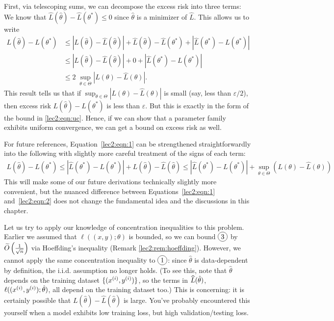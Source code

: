 First, via telescoping sums, we can decompose the excess risk into three terms:
We know that $\hat{L}(\hat{\theta}) - \hat{L}(\theta^*) \leq 0$ since $\hat{\theta}$ is a minimizer of $\hat{L}$. This allows us to write
\begin{align}
L(\hat{\theta}) - L(\theta^*) &\leq |L(\hat{\theta}) - \hat{L}(\hat{\theta})| + \hat{L}(\hat{\theta}) - \hat{L}(\theta^*) + |\hat{L}(\theta^*) - L(\theta^*)|\\
&\leq |L(\hat{\theta}) - \hat{L}(\hat{\theta})| + 0 + |\hat{L}(\theta^*) - L(\theta^*)|\\
&\leq 2\;\sup_{\theta \in \Theta } |L(\theta) - \hat{L}(\theta)|. \label{lec2:eqn:1}
\end{align}
This result tells us that if $\sup_{\theta \in \Theta } |L(\theta) - \hat{L}(\theta)|$ is small (say, less than $\varepsilon/2$), then excess risk $L(\hat{\theta}) - L(\theta^*)$ is less than $\varepsilon$. But this is exactly in the form of the bound in \eqref{lec2:eqn:uc}. Hence, if we can show that a parameter family exhibits uniform convergence, we can get a bound on excess risk as well.

For future references, Equation~\eqref{lec2:eqn:1} can be strengthened straightforwardly into the following with slightly more careful treatment of the signs of each term:
\begin{align}
L(\hat{\theta}) - L(\theta^*) \le |\hat{L}(\theta^*) - L(\theta^*)|+  L(\hat{\theta}) - \hat{L}(\hat{\theta})  \le |\hat{L}(\theta^*) - L(\theta^*)|+ \sup_{\theta \in \Theta} \left(L(\theta) - \hat{L}(\theta)\right)\label{lec2:eqn:2}
\end{align}
This will make some of our future derivations technically slightly more convenient, but the nuanced difference between Equations~\eqref{lec2:eqn:1} and~\eqref{lec2:eqn:2} does not change the fundamental idea and the discussions in this chapter. 

Let us try to apply our knowledge of concentration inequalities to this problem. Earlier we assumed that $\ell((x, y); \theta)$ is bounded, so we can bound $\circled{3}$  
by $\tilO\left(\frac{1}{\sqrt{n}}\right)$ via Hoeffding's inequality (Remark \ref{lec2:rem:hoeffding}). However, we cannot apply the same concentration inequality to $\circled{1}$: since $\hat{\theta}$ is data-dependent by definition, the i.i.d. assumption no longer holds. (To see this, note that $\hat\theta$ depends on the training dataset $\{(x\sp{i}, y\sp{i})\}$, so the terms in $\hatL (\hat\theta)$, $\ell ((x\sp{i}, y\sp{i}); \hat\theta)$, all depend on the training dataset too.) This is concerning: it is certainly possible that $L(\hat{\theta}) - \hat{L}(\hat{\theta})$ is large. You've probably encountered this yourself when a model exhibits low training loss, but high validation/testing loss. 

